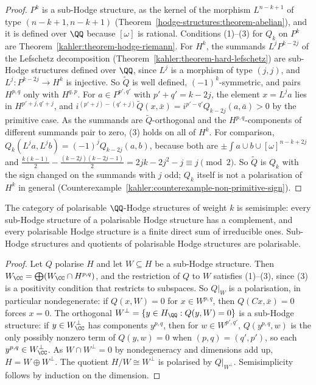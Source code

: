 \begin{proof}
$P^k$ is a sub-Hodge structure, as the kernel of the morphism $L^{n-k+1}$ of type $(n-k+1, n-k+1)$ (Theorem~\ref{hodge-structures:theorem-abelian}), and it is defined over $\QQ$ because $[\omega]$
is rational. Conditions (1)--(3) for $Q_k$ on $P^k$ are Theorem~\ref{kahler:theorem-hodge-riemann}. For $H^k$, the summands $L^jP^{k-2j}$ of the Lefschetz decomposition
(Theorem~\ref{kahler:theorem-hard-lefschetz}) are sub-Hodge structures defined over $\QQ$, since $L^j$ is a morphism of type $(j,j)$, and $L^j \colon P^{k-2j} \to H^k$ is injective. So
$\tilde Q$ is well defined, $(-1)^k$-symmetric, and pairs $H^{p,q}$ only with $H^{q,p}$. For $a \in P^{p',q'}$ with $p' + q' = k - 2j$, the element $x = L^ja$ lies in $H^{p'+j,q'+j}$, and
$i^{(p'+j)-(q'+j)}\tilde Q(x, \bar x) = i^{p'-q'}Q_{k-2j}(a, \bar a) > 0$ by the primitive case. As the summands are $\tilde Q$-orthogonal and the $H^{p,q}$-components of different summands
pair to zero, (3) holds on all of $H^k$. For comparison, $Q_k(L^ja, L^jb) = (-1)^jQ_{k-2j}(a, b)$, because both are $\pm\int a \cup b \cup [\omega]^{n-k+2j}$ and
$\frac{k(k-1)}{2} - \frac{(k-2j)(k-2j-1)}{2} = 2jk - 2j^2 - j \equiv j \pmod 2$. So $\tilde Q$ is $Q_k$ with the sign changed on the summands with $j$ odd; $Q_k$ itself is not a polarisation of $H^k$ in
general (Counterexample~\ref{kahler:counterexample-non-primitive-sign}).
\end{proof}

\begin{theorem}\label{hodge-structures:theorem-semisimple}
The category of polarisable $\QQ$-Hodge structures of weight $k$ is semisimple: every sub-Hodge structure of a polarisable Hodge structure has a complement, and every polarisable Hodge structure is a
finite direct sum of irreducible ones. Sub-Hodge structures and quotients of polarisable Hodge structures are polarisable.
\end{theorem}

\begin{proof}
Let $Q$ polarise $H$ and let $W \subseteq H$ be a sub-Hodge structure. Then $W_\CC = \bigoplus(W_\CC \cap H^{p,q})$, and the restriction of $Q$ to $W$ satisfies (1)--(3), since (3) is a positivity
condition that restricts to subspaces. So $Q|_W$ is a polarisation, in particular nondegenerate: if $Q(x, W) = 0$ for $x \in W^{p,q}$, then $Q(Cx, \bar x) = 0$ forces $x = 0$. The orthogonal
$W^\perp = \{y \in H_\QQ : Q(y, W) = 0\}$ is a sub-Hodge structure: if $y \in W^\perp_\CC$ has components $y^{p,q}$, then for $w \in W^{p',q'}$, $Q(y^{p,q}, w)$ is the only possibly nonzero term of
$Q(y, w) = 0$ when $(p, q) = (q', p')$, so each $y^{p,q} \in W^\perp_\CC$. As $W \cap W^\perp = 0$ by nondegeneracy and dimensions add up, $H = W \oplus W^\perp$. The quotient $H/W \cong W^\perp$ is
polarised by $Q|_{W^\perp}$. Semisimplicity follows by induction on the dimension.
\end{proof}

